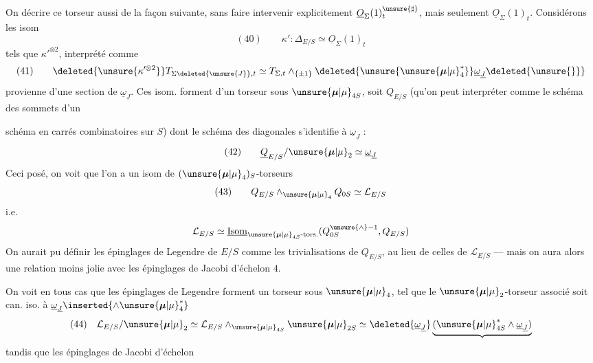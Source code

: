 On  décrire ce torseur aussi de la façon suivante, sans faire intervenir explicitement $\underline{O}_{\Sigma}(1)_t^{\unsure{\sharp}}$, mais seulement $\underline{O}_{\Sigma}(1)_t$. Considérons les isom
\[
(40)\qquad \kappa':\Delta_{E/S}\simeq\underline{O}_{\Sigma}(1)_t
\]
tels que $\kappa'^{\otimes2}$, interprété comme
\[
(41)\qquad \deleted{\unsure{\kappa'^{\otimes2}}}T_{\Sigma\deleted{\unsure{J}},t}\simeq T_{\Sigma,t}\wedge_{\{\pm1\}}\deleted{\unsure{\unsure{\boldsymbol{\mu}|\mu}_4^*}}\underline{\omega}_{\underline{J}}\deleted{\unsure{\}}}
\]
provienne d'une section de $\underline{\omega}_{\underline{J}}$. Ces isom. forment  d'un torseur sous $\unsure{\boldsymbol{\mu}|\mu}_{4S}$, soit $Q_{E/S}$ (qu'on peut interpréter comme le schéma des sommets d'un


schéma en carrés combinatoires sur $S$) dont le schéma des diagonales s'identifie à $\underline{\omega}_{\underline{J}}$ :
\[
(42)\qquad \underline{Q}_{E/S}/\unsure{\boldsymbol{\mu}|\mu}_2\simeq\underline{\omega}_{\underline{J}}
\]
Ceci posé, on voit que l'on a un isom de $(\unsure{\boldsymbol{\mu}|\mu}_4)_S$-torseurs
\[
(43)\qquad Q_{E/S}\wedge_{\unsure{\boldsymbol{\mu}|\mu}_4}Q_{0S}\simeq\mathcal{L}_{E/S}
\]
i.e.
\[
\mathcal{L}_{E/S}\simeq\underline{\operatorname{Isom}}_{\unsure{\boldsymbol{\mu}|\mu}_{4S}\text{-tors.}}(Q_{0S}^{\unsure{\wedge}-1},Q_{E/S})
\]
On aurait pu définir les épinglages de Legendre de $E/S$ comme les trivialisations de $Q_{E/S}$, au lieu de celles de $\mathcal{L}_{E/S}$ --- mais on aura alors une relation moins jolie avec les épinglages de Jacobi d'échelon $4$.

On voit en tous cas que les épinglages de Legendre forment un torseur sous $\unsure{\boldsymbol{\mu}|\mu}_4$, tel que le $\unsure{\boldsymbol{\mu}|\mu}_2$-torseur associé soit can. iso. à $\underline{\omega}_{\underline{J}}\inserted{\wedge\unsure{\boldsymbol{\mu}|\mu}_4^*}$
\[
(44)\quad\mathcal{L}_{E/S}/\unsure{\boldsymbol{\mu}|\mu}_2\simeq\mathcal{L}_{E/S}\wedge_{\unsure{\boldsymbol{\mu}|\mu}_{4S}}\unsure{\boldsymbol{\mu}|\mu}_{2S}\simeq\deleted{\underline{\omega}_{\underline{J}}}\underbrace{(\unsure{\boldsymbol{\mu}|\mu}_{4S}^*\wedge\underline{\omega}_{\underline{J}})}
\]
tandis que les épinglages de Jacobi d'échelon


